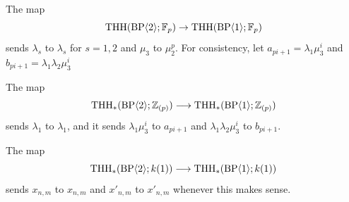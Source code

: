 The map 
\[ 
\operatorname{THH}(\mathrm{BP}\langle 2\rangle ; \mathbb{F}_p)\to  \operatorname{THH}(\mathrm{BP}\langle 1\rangle ; \mathbb{F}_p) 
\]
sends $\lambda_s$ to $\lambda_s$ for $s=1,2$ and $\mu_3$ to $\mu_2^p$. For consistency, let $a_{pi+1}=\lambda_1\mu_3^{i}$ and $b_{pi+1}=\lambda_1\lambda_2\mu_3^{i}$ 

\begin{corollary}
The map 
\[ 
\operatorname{THH}_*(\mathrm{BP}\langle 2\rangle ;\mathbb{Z}_{(p)})\longrightarrow \operatorname{THH}_*(\mathrm{BP}\langle 1\rangle ;\mathbb{Z}_{(p)})
\]
sends $\lambda_1$ to $\lambda_1$, and it sends $\lambda_1\mu_3^i$ to $a_{pi+1}$ and $\lambda_1\lambda_2\mu_3^i$ to $b_{pi+1}$. 

The map 
\[ 
\operatorname{THH}_*(\mathrm{BP}\langle 2\rangle ;k(1))\longrightarrow \operatorname{THH}_*(\mathrm{BP}\langle 1\rangle ;k(1))
\]
sends $x_{n,m}$ to $x_{n,m}$ and $x'_{n,m}$ to $x'_{n,m}$ whenever this makes sense.
\end{corollary}

